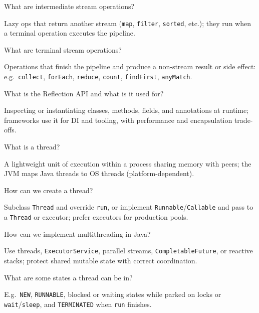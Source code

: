 \question[4]
What are intermediate stream operations?
\makeemptybox{1.2in}
\begin{solution}
  Lazy ops that return another stream (\texttt{map}, \texttt{filter}, \texttt{sorted}, etc.); they run when a terminal operation executes the pipeline.
\end{solution}

\question[4]
What are terminal stream operations?
\makeemptybox{1.2in}
\begin{solution}
  Operations that finish the pipeline and produce a non-stream result or side effect: e.g.\ \texttt{collect}, \texttt{forEach}, \texttt{reduce}, \texttt{count}, \texttt{findFirst}, \texttt{anyMatch}.
\end{solution}

\question[4]
What is the Reflection API and what is it used for?
\makeemptybox{1.35in}
\begin{solution}
  Inspecting or instantiating classes, methods, fields, and annotations at runtime; frameworks use it for DI and tooling, with performance and encapsulation trade-offs.
\end{solution}

\newpage


\question[4]
What is a thread?
\makeemptybox{1in}
\begin{solution}
  A lightweight unit of execution within a process sharing memory with peers; the JVM maps Java threads to OS threads (platform-dependent).
\end{solution}

\question[4]
How can we create a thread?
\makeemptybox{1.2in}
\begin{solution}
  Subclass \texttt{Thread} and override \texttt{run}, or implement \texttt{Runnable}/\texttt{Callable} and pass to a \texttt{Thread} or executor; prefer executors for production pools.
\end{solution}

\question[4]
How can we implement multithreading in Java?
\makeemptybox{1.25in}
\begin{solution}
  Use threads, \texttt{ExecutorService}, parallel streams, \texttt{CompletableFuture}, or reactive stacks; protect shared mutable state with correct coordination.
\end{solution}

\question[4]
What are some states a thread can be in?
\makeemptybox{1.2in}
\begin{solution}
  E.g.\ \texttt{NEW}, \texttt{RUNNABLE}, blocked or waiting states while parked on locks or \texttt{wait}/\texttt{sleep}, and \texttt{TERMINATED} when \texttt{run} finishes.
\end{solution}

